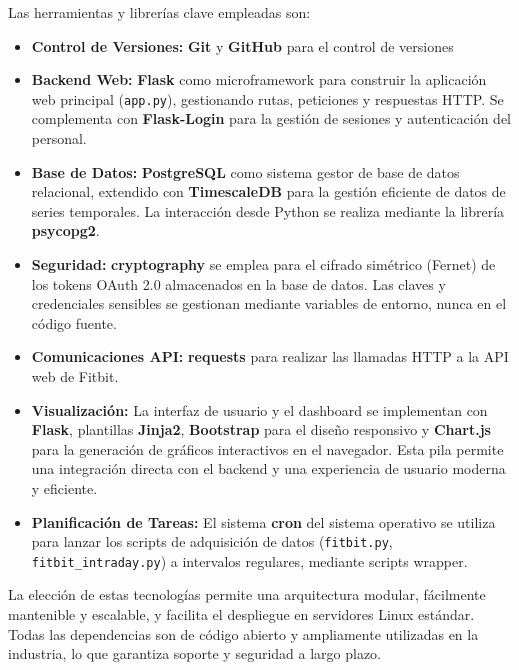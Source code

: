 Las herramientas y librerías clave empleadas son:
\begin{itemize}
    \item \textbf{Control de Versiones:} \textbf{Git} y \textbf{GitHub} \citep{github_repo_proyecto} para el control de versiones
    \item \textbf{Backend Web:} \textbf{Flask} \citep{flask_docs} como microframework para construir la aplicación web principal (\texttt{app.py}), gestionando rutas, peticiones y respuestas HTTP. Se complementa con \textbf{Flask-Login} para la gestión de sesiones y autenticación del personal.
    \item \textbf{Base de Datos:} \textbf{PostgreSQL} \citep{postgresql_docs} como sistema gestor de base de datos relacional, extendido con \textbf{TimescaleDB} \citep{timescaledb_docs} para la gestión eficiente de datos de series temporales. La interacción desde Python se realiza mediante la librería \textbf{psycopg2}.
    \item \textbf{Seguridad:} \textbf{cryptography} \citep{cryptography_docs} se emplea para el cifrado simétrico (Fernet) de los tokens OAuth 2.0 almacenados en la base de datos. Las claves y credenciales sensibles se gestionan mediante variables de entorno, nunca en el código fuente.
    \item \textbf{Comunicaciones API:} \textbf{requests} \citep{requests_docs} para realizar las llamadas HTTP a la API web de Fitbit.
    \item \textbf{Visualización:} La interfaz de usuario y el dashboard se implementan con \textbf{Flask}, plantillas \textbf{Jinja2}, \textbf{Bootstrap} para el diseño responsivo y \textbf{Chart.js} para la generación de gráficos interactivos en el navegador. Esta pila permite una integración directa con el backend y una experiencia de usuario moderna y eficiente.
    \item \textbf{Planificación de Tareas:} El sistema \textbf{cron} del sistema operativo se utiliza para lanzar los scripts de adquisición de datos (\texttt{fitbit.py}, \texttt{fitbit\_intraday.py}) a intervalos regulares, mediante scripts wrapper.
\end{itemize}

La elección de estas tecnologías permite una arquitectura modular, fácilmente mantenible y escalable, y facilita el despliegue en servidores Linux estándar. Todas las dependencias son de código abierto y ampliamente utilizadas en la industria, lo que garantiza soporte y seguridad a largo plazo.


